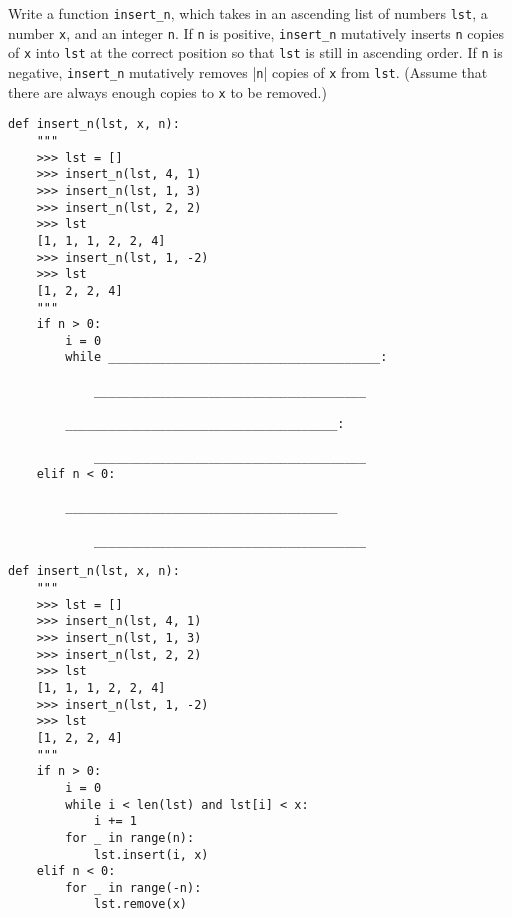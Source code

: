 \begin{blocksection}
\question Write a function \lstinline{insert_n}, which takes in an ascending list of numbers \lstinline{lst}, a number \lstinline{x}, and an integer \lstinline{n}. If \lstinline{n} is positive, \lstinline{insert_n} mutatively inserts \lstinline{n} copies of \lstinline{x} into \lstinline{lst} at the correct position so that \lstinline{lst} is still in ascending order. If \lstinline{n} is negative, \lstinline{insert_n} mutatively removes |\lstinline{n}| copies of \lstinline{x} from \lstinline{lst}. (Assume that there are always enough copies to \lstinline{x} to be removed.) 

\begin{lstlisting}
def insert_n(lst, x, n):
    """
    >>> lst = []
    >>> insert_n(lst, 4, 1)
    >>> insert_n(lst, 1, 3)
    >>> insert_n(lst, 2, 2)
    >>> lst
    [1, 1, 1, 2, 2, 4]
    >>> insert_n(lst, 1, -2)
    >>> lst
    [1, 2, 2, 4]
    """
    if n > 0:
        i = 0
        while ______________________________________:

            ______________________________________

        ______________________________________:

            ______________________________________
    elif n < 0:

        ______________________________________

            ______________________________________
\end{lstlisting}
\end{blocksection}

\begin{blocksection}
\begin{solution}
\begin{lstlisting}
def insert_n(lst, x, n):
    """
    >>> lst = []
    >>> insert_n(lst, 4, 1)
    >>> insert_n(lst, 1, 3)
    >>> insert_n(lst, 2, 2)
    >>> lst
    [1, 1, 1, 2, 2, 4]
    >>> insert_n(lst, 1, -2)
    >>> lst
    [1, 2, 2, 4]
    """
    if n > 0:
        i = 0
        while i < len(lst) and lst[i] < x:
            i += 1
        for _ in range(n):
            lst.insert(i, x)
    elif n < 0:
        for _ in range(-n):
            lst.remove(x)
\end{lstlisting}
\end{solution}
\end{blocksection}

